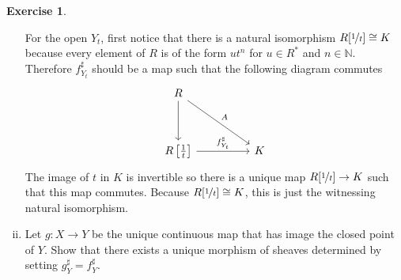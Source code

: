 \documentclass{article}
\newcommand{\N}{\mathbb{N}}
\theoremstyle{definition}
\newtheorem{question}{Exercise}
\begin{document}
\begin{question}
\begin{enumerate}[(i)]
              For the open \(Y_{t}\), first notice that there is a natural
              isomorphism \(R[\nicefrac{1}{t}]\cong K\) because every element of
              \(R\) is of the form \(ut^{n}\) for \(u\in R^{*}\) and \(n\in\N\).
              Therefore \(f^{\sharp}_{Y_{t}}\) should be a map such that the
              following diagram commutes
              \[
                  \begin{tikzcd}[ampersand replacement=\&]
                      R \\
                      \\
                      {R\left[\frac{1}{t}\right]} \&\& K
                      \arrow[from=1-1, to=3-1]
                      \arrow["{f^{\sharp}_{Y_{t}}}", from=3-1, to=3-3]
                      \arrow["{A}", from=1-1, to=3-3]
                  \end{tikzcd}
              \]
              The image of \(t\) in \(K\) is invertible so there is a unique map
              \(R[\nicefrac{1}{t}]\to K\) such that this map commutes. Because
              \(R[\nicefrac{1}{t}]\cong K\), this is just the witnessing
              natural isomorphism.

        \item Let \(g:X\to Y\) be the unique continuous map that has image the
              closed point of \(Y\). Show that there exists a unique morphism of
              sheaves determined by setting \(g^{\sharp}_{Y}=f^{\sharp}_{Y}\).


\end{enumerate}
\end{question}
\end{document}
